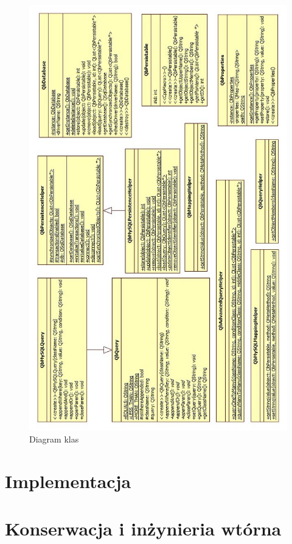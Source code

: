\documentclass[12pt]{report}
\begin{document}
\newpage
\begin{figure}[H]
\centering
\includegraphics[width=\textwidth]{resources/diagram.jpeg}
\caption{Diagram klas}
\end{figure}

\section{Implementacja} %

\section{Konserwacja i inżynieria wtórna} %
\end{document}
